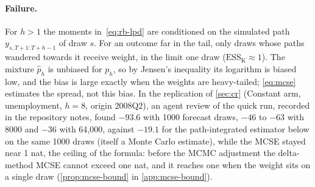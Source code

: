 \paragraph{Failure.}
For $h > 1$ the moments in~\eqref{eq:rb-lpd} are conditioned on the simulated path
$y_{s,T+1:T+h-1}$ of draw $s$.
For an outcome far in the tail, only draws whose paths wandered towards it receive weight, in the
limit one draw ($\mathrm{ESS}_{\mathrm{K}} \approx 1$). The mixture $\hat p_h$ is unbiased for
$p_h$, so by Jensen's inequality its logarithm is biased low, and the bias is large exactly when the
weights are heavy-tailed; \eqref{eq:mcse} estimates the spread, not this bias.
In the replication of \cref{sec:cr} (Constant arm, unemployment, $h = 8$, origin 2008Q2), an agent review
of the quick run, recorded in the repository notes, found $-93.6$ with 1000 forecast draws, $-46$
to $-63$ with 8000 and $-36$ with 64{,}000, against $-19.1$ for the path-integrated estimator below
on the same 1000 draws (itself a Monte Carlo estimate), while the MCSE stayed near 1 nat, the
ceiling of the formula: before the MCMC adjustment the delta-method MCSE cannot exceed one nat, and
it reaches one when the weight sits on a single draw (\cref{prop:mcse-bound} in \cref{app:mcse-bound}).

